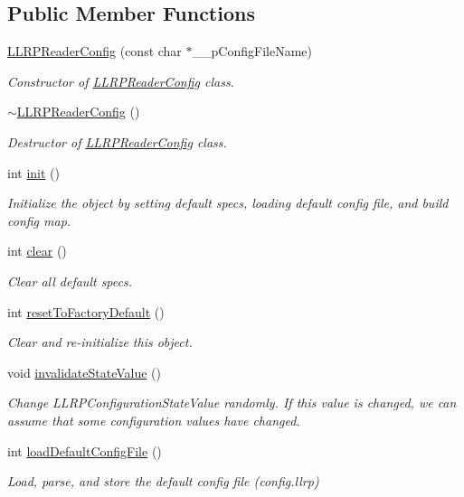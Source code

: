 \subsection*{Public Member Functions}
\begin{DoxyCompactItemize}
\item 
\hyperlink{class_e_l_f_i_n_1_1_l_l_r_p_reader_config_a4f55e8679938e946b457a600c7ea5016}{L\-L\-R\-P\-Reader\-Config} (const char $\ast$\-\_\-\-\_\-p\-Config\-File\-Name)
\begin{DoxyCompactList}\small\item\em Constructor of \hyperlink{class_e_l_f_i_n_1_1_l_l_r_p_reader_config}{L\-L\-R\-P\-Reader\-Config} class. \end{DoxyCompactList}\item 
\hyperlink{class_e_l_f_i_n_1_1_l_l_r_p_reader_config_a30a347d49f018e52fa872b6a69e8931d}{$\sim$\-L\-L\-R\-P\-Reader\-Config} ()
\begin{DoxyCompactList}\small\item\em Destructor of \hyperlink{class_e_l_f_i_n_1_1_l_l_r_p_reader_config}{L\-L\-R\-P\-Reader\-Config} class. \end{DoxyCompactList}\item 
int \hyperlink{class_e_l_f_i_n_1_1_l_l_r_p_reader_config_a91159abaa6a11a46528d199b1c7cda70}{init} ()
\begin{DoxyCompactList}\small\item\em Initialize the object by setting default specs, loading default config file, and build config map. \end{DoxyCompactList}\item 
int \hyperlink{class_e_l_f_i_n_1_1_l_l_r_p_reader_config_a4463324245c5a0158e1ab0010e14f1b7}{clear} ()
\begin{DoxyCompactList}\small\item\em Clear all default specs. \end{DoxyCompactList}\item 
int \hyperlink{class_e_l_f_i_n_1_1_l_l_r_p_reader_config_a1cf22a9b6a589946549f9f8ea0722609}{reset\-To\-Factory\-Default} ()
\begin{DoxyCompactList}\small\item\em Clear and re-\/initialize this object. \end{DoxyCompactList}\item 
void \hyperlink{class_e_l_f_i_n_1_1_l_l_r_p_reader_config_a0095d39a3ef2511c0571c429c02c3ce3}{invalidate\-State\-Value} ()
\begin{DoxyCompactList}\small\item\em Change L\-L\-R\-P\-Configuration\-State\-Value randomly. If this value is changed, we can assume that some configuration values have changed. \end{DoxyCompactList}\item 
int \hyperlink{class_e_l_f_i_n_1_1_l_l_r_p_reader_config_aca8c99f935626d94e87f7fe7f9257def}{load\-Default\-Config\-File} ()
\begin{DoxyCompactList}\small\item\em Load, parse, and store the default config file ({\itshape config.\-llrp}) \end{DoxyCompactList}\end{DoxyCompactItemize}
